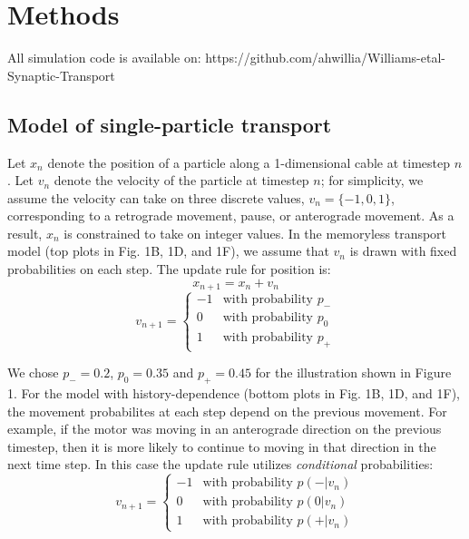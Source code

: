 \documentclass[11pt]{wlpeerj}
\begin{document}
\section*{Methods}

All simulation code is available on: https://github.com/ahwillia/Williams-etal-Synaptic-Transport

\subsection*{Model of single-particle transport}

Let $x_n$ denote the position of a particle along a 1-dimensional cable at timestep $n$. Let $v_n$ denote the velocity of the particle at timestep $n$; for simplicity, we assume the velocity can take on three discrete values, $v_n = \{-1,0,1\}$, corresponding to a retrograde movement, pause, or anterograde movement. As a result, $x_n$ is constrained to take on integer values. In the memoryless transport model (top plots in Fig. 1B, 1D, and 1F), we assume that $v_n$ is drawn with fixed probabilities on each step. The update rule for position is:
$$x_{n+1} = x_n + v_n$$
$$v_{n+1} = \left\{\begin{matrix}
-1 & \text{with probability } p_-\\ 
0 & \text{with probability } p_0\\  
1 & \text{with probability } p_+
\end{matrix}\right.$$

We chose $p_- = 0.2$, $p_0 = 0.35$ and $p_+ = 0.45$ for the illustration shown in Figure 1. For the model with history-dependence (bottom plots in Fig. 1B, 1D, and 1F), the movement probabilites at each step depend on the previous movement. For example, if the motor was moving in an anterograde direction on the previous timestep, then it is more likely to continue to moving in that direction in the next time step. In this case the update rule utilizes \textit{conditional} probabilities:
$$v_{n+1} = \left\{\begin{matrix}
-1 & \text{with probability } p(-|v_n)\\ 
0 & \text{with probability } p(0|v_n)\\  
1 & \text{with probability } p(+|v_n)
\end{matrix}\right.$$
\end{document}
